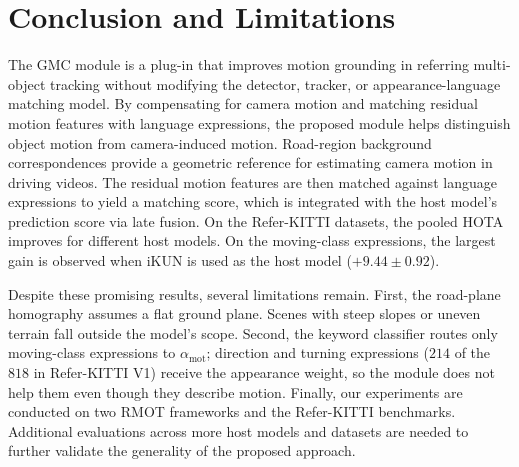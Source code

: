\documentclass{article}
\begin{document}
\section{Conclusion and Limitations}
\label{sec:conclusion}
The GMC module is a plug-in that improves motion grounding in referring multi-object tracking without modifying the detector, tracker, or appearance-language matching model. By compensating for camera motion and matching residual motion features with language expressions, the proposed module helps distinguish object motion from camera-induced motion. Road-region background correspondences provide a geometric reference for estimating camera motion in driving videos. The residual motion features are then matched against language expressions to yield a matching score, which is integrated with the host model's prediction score via late fusion. On the Refer-KITTI datasets, the pooled HOTA improves for different host models. On the moving-class expressions, the largest gain is observed when iKUN is used as the host model ($+9.44\pm0.92$).

Despite these promising results, several limitations remain. First, the road-plane homography assumes a flat ground plane. Scenes with steep slopes or uneven terrain fall outside the model's scope. Second, the keyword classifier routes only moving-class expressions to $\alpha_{\mathrm{mot}}$; direction and turning expressions ($214$ of the $818$ in Refer-KITTI V1) receive the appearance weight, so the module does not help them even though they describe motion. Finally, our experiments are conducted on two RMOT frameworks and the Refer-KITTI benchmarks. Additional evaluations across more host models and datasets are needed to further validate the generality of the proposed approach.



\end{document}
